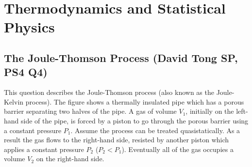 
\section{Thermodynamics and Statistical Physics}
\subsection{The Joule-Thomson Process (David Tong SP, PS4 Q4)}
\label{sec:joule-thomson}

This question describes the Joule-Thomson process (also known as
the Joule-Kelvin process). The figure shows a thermally insulated pipe which
has a porous barrier separating two halves of the pipe. A gas of volume $V_1$,
initially on the left-hand side of the pipe, is forced by a piston to go
through the porous barrier using a constant pressure $P_1$. Assume the process
can be treated quasistatically. As a result the gas flows to the right-hand
side, resisted by another piston which applies a constant pressure $P_2$
($P_2 < P_1$). Eventually all of the gas occupies a volume $V_2$ on the
right-hand side.

